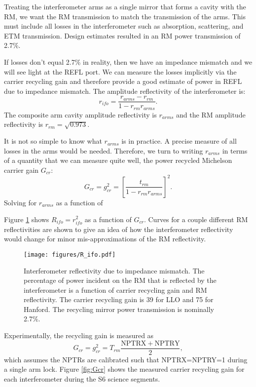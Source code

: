 Treating the interferometer arms as a single mirror that forms a cavity with the RM, we want the RM 
transmission to match the transmission of the arms. This must include all losses in the interferometer 
such as absorption, scattering, and ETM transmission. Design estimates resulted in an RM power 
transmission of 2.7\%. 

If losses don't equal 2.7\% in reality, then we have an impedance mismatch and we will see light at the 
REFL port. We can measure the losses implicitly via the carrier recycling gain and therefore provide a 
good estimate of power in REFL due to impedance mismatch. The
amplitude reflectivity of the interferometer is:
\begin{equation} 
r_{ifo} = \frac{r_{arms}-r_{rm}}{1-r_{rm}r_{arms}}.
\end{equation}
The composite arm cavity amplitude
reflectivity is $r_{arms}$ and the RM amplitude reflectivity is
$r_{rm} = \sqrt{0.973}$. 

It is not so simple to know what $r_{arms}$ is
in practice. A precise measure of all losses in the arms would be
needed. Therefore, we turn to writing $r_{arms}$ in terms of a
quantity that we can measure quite well, the power recycled Michelson
carrier gain $G_{cr}$:
\begin{equation}
G_{cr} = g_{cr}^2 = \left[\frac{t_{rm}}{1-r_{rm}r_{arms}}\right]^2.
\end{equation}
Solving for $r_{arms}$ as a function of 

Figure \ref{fig:reflectivity} shows $R_{ifo} = r_{ifo}^2$ as a
function of $G_{cr}$. Curves for a couple different RM reflectivities
are shown to give an idea of how the interferometer reflectivity would
change for minor mis-approximations of the RM reflectivity. 
\begin{figure}
\begin{centering}
\texttt{[image: figures/R\_ifo.pdf]}
\caption[Interferometer reflectivity due to impedance
mismatch]{Interferometer reflectivity due to impedance mismatch. The
  percentage of power incident on the RM that is reflected by the
  interferometer is a function of carrier recycling gain and RM
  reflectivity. The carrier recycling gain is 39 for LLO and 75 for
  Hanford. The recycling mirror power transmission is nominally
  2.7\%.}
\label{fig:reflectivity}
\end{centering}
\end{figure}

Experimentally, the recycling gain is measured as
\begin{equation}
G_{cr} = g_{cr}^2 = T_{rm} \frac{\mathrm{NPTRX + NPTRY}}{2},
\end{equation}
which assumes the NPTRs are calibrated such that NPTRX=NPTRY=1 during a
single arm lock. Figure \ref{fig:Gcr} shows the measured carrier
recycling gain for each interferometer during the S6 science
segments. 

